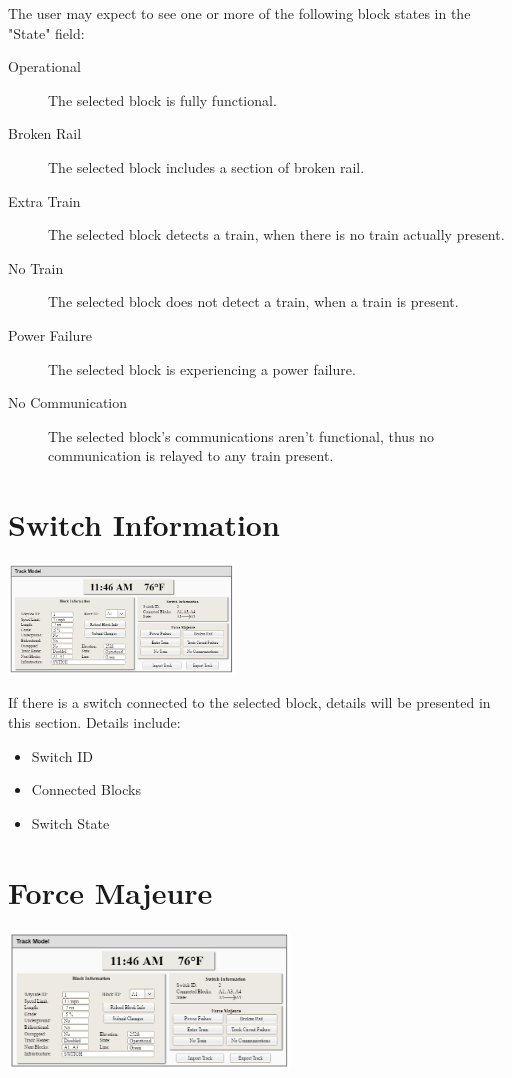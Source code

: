 \documentclass{scrreprt}
\begin{document}
The user may expect to see one or more of the following block states in the "State" field:
\begin{description}
    \item[Operational] The selected block is fully functional.
    \item[Broken Rail] The selected block includes a section of broken rail.
    \item[Extra Train] The selected block detects a train, when there is no train 
        actually present.
    \item[No Train] The selected block does not detect a train, when a train is present.
    \item[Power Failure] The selected block is experiencing a power failure.
    \item[No Communication] The selected block's communications aren't functional, thus no
        communication is relayed to any train present.
\end{description}

\section{Switch Information}

\begin{center}
    \includegraphics[trim={14.2cm 5.75cm .5cm 3.6cm},clip,width=6cm]{track-model}
\end{center}

If there is a switch connected to the selected block, details will be presented in
this section. Details include:
\begin{itemize}
    \item Switch ID
    \item Connected Blocks
    \item Switch State
\end{itemize}

\section{Force Majeure}

\begin{center}
    \includegraphics[trim={14.2cm 1.75cm .5cm 6.5cm},clip,width=7.5cm]{track-model}
\end{center}
\end{document}
